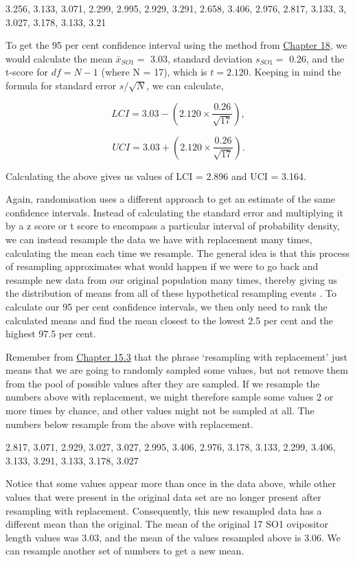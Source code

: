 \documentclass[
  openany]{scrbook}
\begin{document}
3.256, 3.133, 3.071, 2.299, 2.995, 2.929, 3.291, 2.658, 3.406, 2.976, 2.817, 3.133, 3, 3.027, 3.178, 3.133, 3.21

To get the 95 per cent confidence interval using the method from \protect\hyperlink{Chapter_18}{Chapter 18}, we would calculate the mean \(\bar{x}_{SO1} =\) 3.03, standard deviation \(s_{SO1} =\) 0.26, and the t-score for \(df = N - 1\) (where N = 17), which is \(t = 2.120\).
Keeping in mind the formula for standard error \(s/\sqrt{N}\), we can calculate,

\[LCI = 3.03 - \left(2.120 \times \frac{0.26}{\sqrt{17}}\right),\]

\[UCI = 3.03 + \left(2.120 \times \frac{0.26}{\sqrt{17}}\right).\]

Calculating the above gives us values of LCI = 2.896 and UCI = 3.164.

Again, randomisation uses a different approach to get an estimate of the same confidence intervals.
Instead of calculating the standard error and multiplying it by a z score or t score to encompass a particular interval of probability density, we can instead resample the data we have with replacement many times, calculating the mean each time we resample.
The general idea is that this process of resampling approximates what would happen if we were to go back and resample new data from our original population many times, thereby giving us the distribution of means from all of these hypothetical resampling events \citep{Manly2007}.
To calculate our 95 per cent confidence intervals, we then only need to rank the calculated means and find the mean closest to the lowest 2.5 per cent and the highest 97.5 per cent.

Remember from \protect\hyperlink{sampling-with-and-without-replacement}{Chapter 15.3} that the phrase `resampling with replacement' just means that we are going to randomly sampled some values, but not remove them from the pool of possible values after they are sampled.
If we resample the numbers above with replacement, we might therefore sample some values 2 or more times by chance, and other values might not be sampled at all.
The numbers below resample from the above with replacement.

2.817, 3.071, 2.929, 3.027, 3.027, 2.995, 3.406, 2.976, 3.178, 3.133, 2.299, 3.406, 3.133, 3.291, 3.133, 3.178, 3.027

Notice that some values appear more than once in the data above, while other values that were present in the original data set are no longer present after resampling with replacement. Consequently, this new resampled data has a different mean than the original.
The mean of the original 17 SO1 ovipositor length values was 3.03, and the mean of the values resampled above is 3.06.
We can resample another set of numbers to get a new mean.
\end{document}
